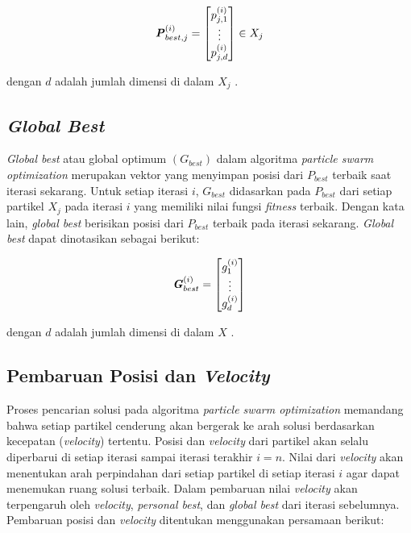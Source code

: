 {{    \begin{equation}
        \textbf{\textit{P}}_{best,j}^{(i)} = \begin{bmatrix} p_{j,1}^{(i)} \\ \vdots \\ p_{j,d}^{(i)} \end{bmatrix} \in X_{j}
        \label{pers: Pbest}
    \end{equation}

    \noindent
    dengan $d$ adalah jumlah dimensi di dalam $X_{j}$ .
}

\vspace{-5mm}
\subsection{\textit{Global Best}}
{\frenchspacing
    \textit{Global best} atau global optimum $\left(G_{best}\right)$ dalam algoritma \textit{particle swarm optimization} merupakan vektor yang menyimpan
    posisi dari $P_{best}$ terbaik saat iterasi sekarang.
    Untuk setiap iterasi $i$, $G_{best}$ didasarkan pada $P_{best}$ dari setiap partikel $X_{j}$ pada iterasi $i$ yang memiliki nilai fungsi \textit{fitness} terbaik.
    Dengan kata lain, \textit{global best} berisikan posisi dari $P_{best}$ terbaik pada iterasi sekarang.
    \textit{Global best} dapat dinotasikan sebagai berikut:

    \begin{equation}
        \textbf{\textit{G}}_{best}^{(i)} = \begin{bmatrix} g^{(i)}_{1} \\ \vdots \\ g^{(i)}_{d} \end{bmatrix}
        \label{pers: Gbest}
    \end{equation}

    \noindent
    dengan $d$ adalah jumlah dimensi di dalam $X$ .
}

\vspace{-5mm}
\subsection{Pembaruan Posisi dan \textit{Velocity}}
{\frenchspacing
Proses pencarian solusi pada algoritma \textit{particle swarm optimization} memandang bahwa setiap partikel cenderung akan bergerak
ke arah solusi berdasarkan kecepatan (\textit{velocity}) tertentu.
Posisi dan \textit{velocity} dari partikel akan selalu diperbarui di setiap iterasi sampai iterasi terakhir $i=n$.
Nilai dari \textit{velocity} akan menentukan arah perpindahan dari setiap partikel di setiap iterasi $i$ agar dapat menemukan ruang solusi terbaik.
Dalam pembaruan nilai \textit{velocity} akan terpengaruh oleh \textit{velocity}, \textit{personal best}, dan \textit{global best} dari iterasi sebelumnya.
Pembaruan posisi dan \textit{velocity} ditentukan menggunakan persamaan berikut:

}}

